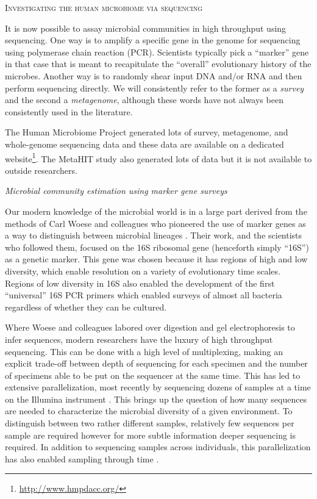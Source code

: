 \documentclass{amsart}
\renewcommand{\section}[1]{%
\bigskip
\begin{center}
\begin{Large}
\normalfont\scshape #1
\medskip
\end{Large}
\end{center}}
\renewcommand{\subsection}[1]{%
\bigskip
\begin{center}
\begin{large}
\normalfont\itshape #1
\end{large}
\end{center}}
\begin{document}
\section{Investigating the human microbiome via sequencing}
It is now possible to assay microbial communities in high throughput using sequencing.
One way is to amplify a specific gene in the genome for sequencing using polymerase chain reaction (PCR).
Scientists typically pick a ``marker'' gene in that case that is meant to recapitulate the ``overall'' evolutionary history of the microbes.
Another way is to randomly shear input DNA and/or RNA and then perform sequencing directly.
We will consistently refer to the former as a \textit{survey} and the second a \textit{metagenome}, although these words have not always been consistently used in the literature.

The Human Microbiome Project \citep{methe2012framework} generated lots of survey, metagenome, and whole-genome sequencing data and these data are available on a dedicated website\footnote{\url{http://www.hmpdacc.org/}}.
The MetaHIT study \citep{qin2010human} also generated lots of data but it is not available to outside researchers.

\subsection{Microbial community estimation using marker gene surveys}
Our modern knowledge of the microbial world is in a large part derived from the methods of Carl Woese and colleagues who pioneered the use of marker genes as a way to distinguish between microbial lineages \citep{fox1977comparative}.
Their work, and the scientists who followed them, focused on the 16S ribosomal gene (henceforth simply ``16S'') as a genetic marker.
This gene was chosen because it has regions of high and low diversity, which enable resolution on a variety of evolutionary time scales.
Regions of low diversity in 16S also enabled the development of the first ``universal'' 16S PCR primers \citep{lane1985rapid} which enabled surveys of almost all bacteria regardless of whether they can be cultured.

Where Woese and colleagues labored over digestion and gel electrophoresis to infer sequences, modern researchers have the luxury of high throughput sequencing.
This can be done with a high level of multiplexing, making an explicit trade-off between depth of sequencing for each specimen and the number of specimens able to be put on the sequencer at the same time.
This has led to extensive parallelization, most recently by sequencing dozens of samples at a time on the Illumina instrument \citep{degnan2011illumina,caporaso2012ultra}.
This brings up the question of how many sequences are needed to characterize the microbial diversity of a given environment.
To distinguish between two rather different samples, relatively few sequences per sample are required \citep{kuczynski2010microbial} however for more subtle information deeper sequencing is required.
In addition to sequencing samples across individuals, this parallelization has also enabled sampling through time \citep[e.g.][]{caporaso2011moving}.
\end{document}
